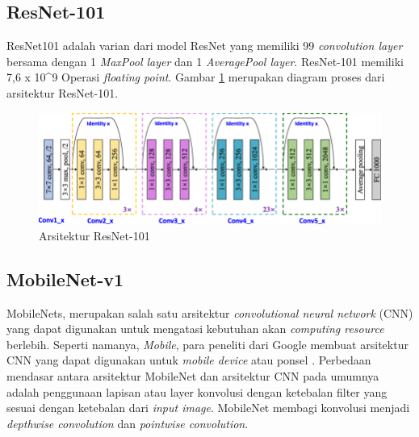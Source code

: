 \subsection{ResNet-101}
\label{subsec:resnet101-definition}

ResNet101 adalah varian dari model ResNet yang memiliki 99 \textit{convolution layer} bersama dengan 1 \textit{MaxPool layer} dan 1 \textit{AveragePool layer}. ResNet-101 memiliki 7,6 x 10\^{}9 Operasi \textit{floating point}. Gambar \ref{fig:resnet101-arch} merupakan diagram proses dari arsitektur ResNet-101.
\begin{figure}[H]
	\centering
	\includegraphics[scale=0.25]{gambar/resnet101-arch.png}
	\caption{Arsitektur ResNet-101 \citep{resnet101-arch}}
	\label{fig:resnet101-arch}
\end{figure}

\subsection{MobileNet-v1}
\label{subsec:mobilenetv1-definition}

MobileNets, merupakan salah satu arsitektur \textit{convolutional neural network} (CNN) yang dapat digunakan untuk mengatasi kebutuhan akan \textit{computing resource} berlebih. Seperti namanya, \textit{Mobile}, para peneliti dari Google membuat arsitektur CNN yang dapat digunakan untuk \textit{mobile device} atau ponsel \citep{mobilnet-def}. Perbedaan mendasar antara arsitektur MobileNet dan arsitektur CNN pada umumnya adalah penggunaan lapisan atau layer konvolusi dengan ketebalan filter yang sesuai dengan ketebalan dari \textit{input image}. MobileNet membagi konvolusi menjadi \textit{depthwise convolution} dan \textit{pointwise convolution}.

